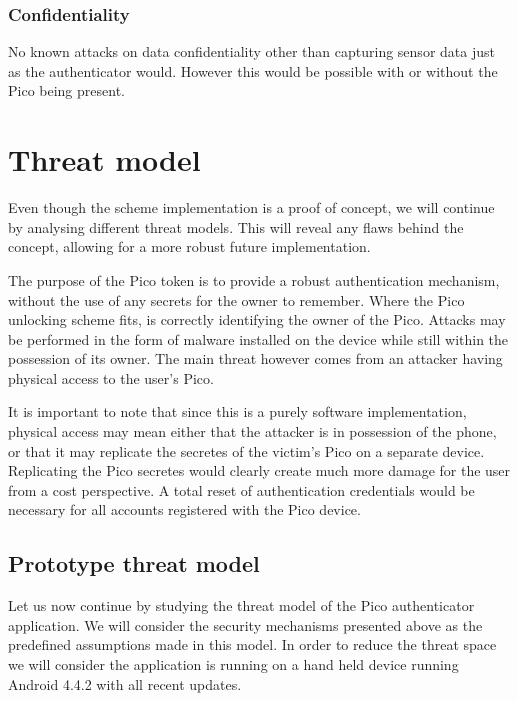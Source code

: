 	\subsubsection*{Confidentiality}
	No known attacks on data confidentiality other than capturing sensor data just as the authenticator would. However this would be possible with or without the Pico being present.



\section{Threat model}

Even though the scheme implementation is a proof of concept, we will continue by analysing different threat models. This will reveal any flaws behind the concept, allowing for a more robust future implementation.

The purpose of the Pico token is to provide a robust authentication mechanism, without the use of any secrets for the owner to remember. Where the Pico unlocking scheme fits, is correctly identifying the owner of the Pico. Attacks may be performed in the form of malware installed on the device while still within the possession of its owner. The main threat however comes from an attacker having physical access to the user's Pico. 

It is important to note that since this is a purely software implementation, physical access may mean either that the attacker is in possession of the phone, or that it may replicate the secretes of the victim's Pico on a separate device. Replicating the Pico secretes would clearly create much more damage for the user from a cost perspective. A total reset of authentication credentials would be necessary for all accounts registered with the Pico device.



\subsection{Prototype threat model}
Let us now continue by studying the threat model of the Pico authenticator application. We will consider the security mechanisms presented above as the predefined assumptions made in this model. In order to reduce the threat space we will consider the application is running on a hand held device running Android 4.4.2 with all recent updates.

